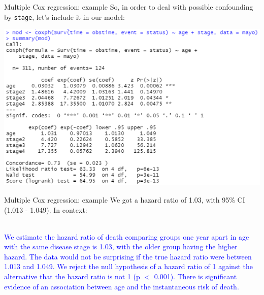 \documentclass[10pt,t]{beamer}
\begin{document}
\begin{frame}{Multiple Cox regression: example}
	So, in order to deal with possible confounding by \texttt{stage}, let's include it in our model:
		\begin{center}
		\includegraphics[width = \textwidth]{figs/multiple_cox_regression_code.png}
	\end{center}
\end{frame}

\begin{frame}{Multiple Cox regression: example}
		We got a hazard ratio of 1.03, with 95\% CI (1.013 - 1.049). In context:
	\\ ~\ 
	
		\textcolor{blue}{We estimate the hazard ratio of death comparing groups one year apart in age with the same disease stage is 1.03, with the older group having the higher hazard. The data would not be surprising if the true hazard ratio were between 1.013 and 1.049. We reject the null hypothesis of a hazard ratio of 1 against the alternative that the hazard ratio is not 1 (p $<$ 0.001). There is significant evidence of an association between age and the instantaneous risk of death.}
\end{frame}
\end{document}
